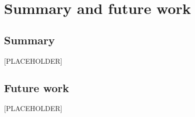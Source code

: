 \chapter{Summary and future work}

\section{Summary}

[PLACEHOLDER]

\section{Future work}

[PLACEHOLDER]
